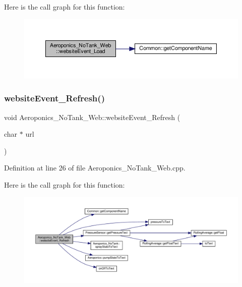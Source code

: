 Here is the call graph for this function\+:
\nopagebreak
\begin{figure}[H]
\begin{center}
\leavevmode
\includegraphics[width=350pt]{class_aeroponics___no_tank___web_a59a1c123bc843197e74c16e8aac7daa2_cgraph}
\end{center}
\end{figure}
\mbox{\label{class_aeroponics___no_tank___web_a1248fe0a06097426645344b35aec0431}} 
\subsubsection{\texorpdfstring{website\+Event\+\_\+\+Refresh()}{websiteEvent\_Refresh()}}
{\footnotesize\ttfamily void Aeroponics\+\_\+\+No\+Tank\+\_\+\+Web\+::website\+Event\+\_\+\+Refresh (\begin{DoxyParamCaption}\item[{char $\ast$}]{url }\end{DoxyParamCaption})}



Definition at line 26 of file Aeroponics\+\_\+\+No\+Tank\+\_\+\+Web.\+cpp.

Here is the call graph for this function\+:
\nopagebreak
\begin{figure}[H]
\begin{center}
\leavevmode
\includegraphics[width=350pt]{class_aeroponics___no_tank___web_a1248fe0a06097426645344b35aec0431_cgraph}
\end{center}
\end{figure}


